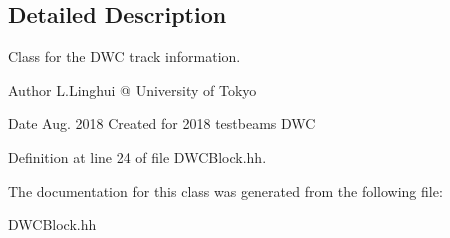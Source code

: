 \subsection{Detailed Description}
Class for the D\-W\-C track information. 

\begin{DoxyAuthor}{Author}
L.\-Linghui @ University of Tokyo 
\end{DoxyAuthor}
\begin{DoxyDate}{Date}
Aug. 2018 Created for 2018 testbeams D\-W\-C 
\end{DoxyDate}


Definition at line 24 of file D\-W\-C\-Block.\-hh.



The documentation for this class was generated from the following file\-:\begin{DoxyCompactItemize}
\item 
D\-W\-C\-Block.\-hh\end{DoxyCompactItemize}
